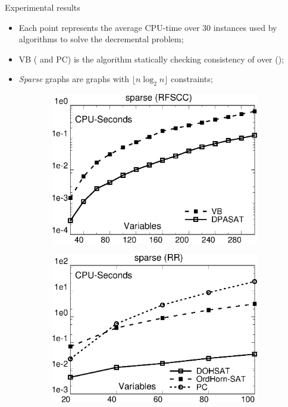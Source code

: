 \begin{frame}{Experimental results}
    \begin{itemize}
        \item Each point represents the average CPU-time over 30 instances used by algorithms to solve the decremental problem;
        \item VB (\OHSATAlgorithmName{} and PC) is the \stateofart{} algorithm statically checking consistency of \TCSPName{} over \PAName{} (\OrdHornName{});
        \item \textit{Sparse} graphs are graphs with $\lfloor n \log_2{n} \rfloor$ constraints;
    \end{itemize}

    \begin{figure}
        \centering
        \begin{subfigure}{0.49\textwidth}
            \centering
            \includegraphics[width=1.0\textwidth]{src/images/temporal-reasoning/dpasat}
        \end{subfigure}%
        \begin{subfigure}{0.49\textwidth}
            \centering
            \includegraphics[width=1.0\textwidth]{src/images/temporal-reasoning/dohsat}
        \end{subfigure}
    \end{figure}
\end{frame}
